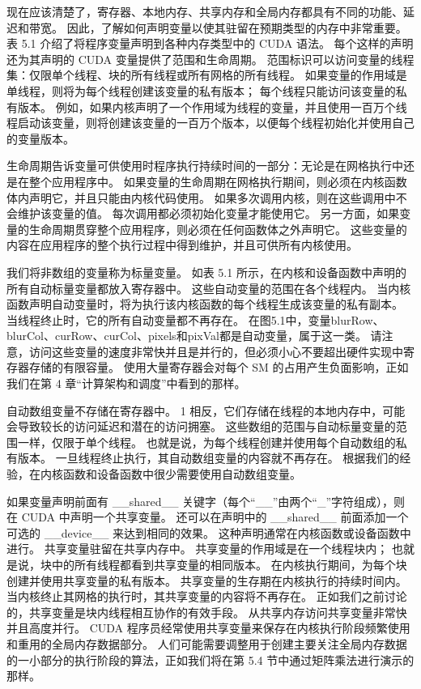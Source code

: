 现在应该清楚了，寄存器、本地内存、共享内存和全局内存都具有不同的功能、延迟和带宽。 因此，了解如何声明变量以使其驻留在预期类型的内存中非常重要。 表 5.1 介绍了将程序变量声明到各种内存类型中的 CUDA 语法。 每个这样的声明还为其声明的 CUDA 变量提供了范围和生命周期。 范围标识可以访问变量的线程集：仅限单个线程、块的所有线程或所有网格的所有线程。 如果变量的作用域是单线程，则将为每个线程创建该变量的私有版本； 每个线程只能访问该变量的私有版本。 例如，如果内核声明了一个作用域为线程的变量，并且使用一百万个线程启动该变量，则将创建该变量的一百万个版本，以便每个线程初始化并使用自己的变量版本。

生命周期告诉变量可供使用时程序执行持续时间的一部分：无论是在网格执行中还是在整个应用程序中。 如果变量的生命周期在网格执行期间，则必须在内核函数体内声明它，并且只能由内核代码使用。 如果多次调用内核，则在这些调用中不会维护该变量的值。 每次调用都必须初始化变量才能使用它。 另一方面，如果变量的生命周期贯穿整个应用程序，则必须在任何函数体之外声明它。 这些变量的内容在应用程序的整个执行过程中得到维护，并且可供所有内核使用。

我们将非数组的变量称为标量变量。 如表 5.1 所示，在内核和设备函数中声明的所有自动标量变量都放入寄存器中。 这些自动变量的范围在各个线程内。 当内核函数声明自动变量时，将为执行该内核函数的每个线程生成该变量的私有副本。 当线程终止时，它的所有自动变量都不再存在。 在图5.1中，变量blurRow、blurCol、curRow、curCol、pixels和pixVal都是自动变量，属于这一类。 请注意，访问这些变量的速度非常快并且是并行的，但必须小心不要超出硬件实现中寄存器存储的有限容量。 使用大量寄存器会对每个 SM 的占用产生负面影响，正如我们在第 4 章“计算架构和调度”中看到的那样。

自动数组变量不存储在寄存器中。 1 相反，它们存储在线程的本地内存中，可能会导致较长的访问延迟和潜在的访问拥塞。 这些数组的范围与自动标量变量的范围一样，仅限于单个线程。 也就是说，为每个线程创建并使用每个自动数组的私有版本。 一旦线程终止执行，其自动数组变量的内容就不再存在。 根据我们的经验，在内核函数和设备函数中很少需要使用自动数组变量。

如果变量声明前面有 \_\_shared\_\_ 关键字（每个“\_\_”由两个“\_”字符组成），则在 CUDA 中声明一个共享变量。 还可以在声明中的 \_\_shared\_\_ 前面添加一个可选的 \_\_device\_\_ 来达到相同的效果。 这种声明通常在内核函数或设备函数中进行。 共享变量驻留在共享内存中。 共享变量的作用域是在一个线程块内； 也就是说，块中的所有线程都看到共享变量的相同版本。 在内核执行期间，为每个块创建并使用共享变量的私有版本。 共享变量的生存期在内核执行的持续时间内。 当内核终止其网格的执行时，其共享变量的内容将不再存在。 正如我们之前讨论的，共享变量是块内线程相互协作的有效手段。 从共享内存访问共享变量非常快并且高度并行。 CUDA 程序员经常使用共享变量来保存在内核执行阶段频繁使用和重用的全局内存数据部分。 人们可能需要调整用于创建主要关注全局内存数据的一小部分的执行阶段的算法，正如我们将在第 5.4 节中通过矩阵乘法进行演示的那样。


